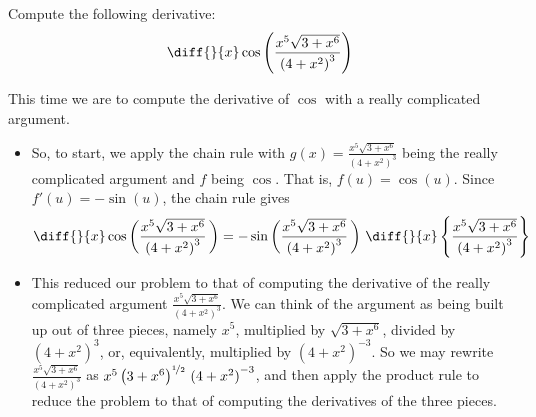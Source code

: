 \goodbreak
\begin{eg}\label{eg:DIFFchainD}
Compute the following derivative:
\begin{align*}
\diff{}{x}\cos\left(\frac{x^5\sqrt{3+x^6}}{{(4+x^2)}^3}\right)
\end{align*}

This time we are to compute the derivative of $\cos$ with a really
complicated argument.
\begin{itemize}
 \item So, to start, we apply
the chain rule with $g(x)=\frac{x^5\sqrt{3+x^6}}{{(4+x^2)}^3}$
being the really complicated argument and $f$ being $\cos$. That is,
$f(u)=\cos(u)$. Since  $f'(u)=-\sin(u)$, the chain rule gives
\begin{align*}
\diff{}{x}\cos\bigg(\frac{x^5\sqrt{3+x^6}}{{(4+x^2)}^3}\,\bigg)
=-\sin\bigg(\frac{x^5\sqrt{3+x^6}}{{(4+x^2)}^3}\,\bigg)\
\diff{}{x} \left\{\frac{x^5\sqrt{3+x^6}}{{(4+x^2)}^3} \right\}
\end{align*}
\item This reduced our problem to that of computing the derivative
of the really complicated argument $\tfrac{x^5\sqrt{3+x^6}}{{(4+x^2)}^3}$.
We can think of the argument as being built up out of three pieces,
namely $x^5$, multiplied by $\sqrt{3+x^6}$, divided by
${(4+x^2)}^3$, or, equivalently, multiplied by ${(4+x^2)}^{-3}$. So we may
rewrite $\tfrac{x^5\sqrt{3+x^6}}{{(4+x^2)}^3}$ as
$x^5\,\big(3+x^6\big)^{\nicefrac{1}{2}}\ {(4+x^2)}^{-3}$,
and then apply the product rule to reduce the problem to that of computing
the derivatives of the three pieces.


\end{itemize}
\end{eg}
